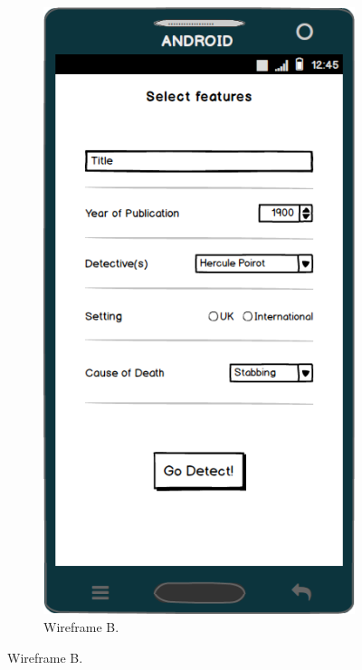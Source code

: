 \documentclass{mproj}
\begin{document}
\begin{figure}
	\quad
	\begin{subfigure}{0.3\textwidth}
		\includegraphics[width=\textwidth]{images/single_text_only}
		\caption{Wireframe B.}
		\label{fig:wireframeB}		
	\end{subfigure}
	

\end{figure}
\end{document}
